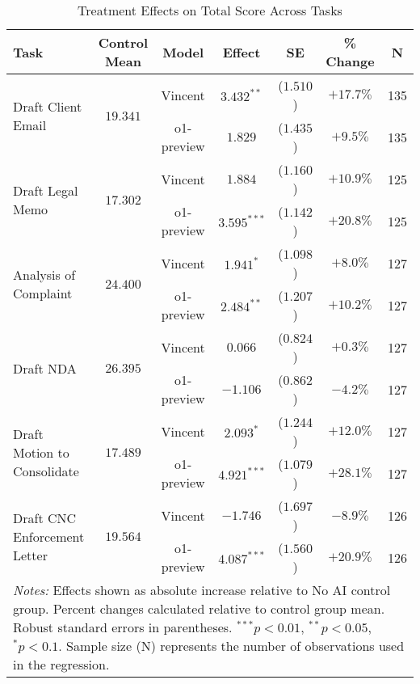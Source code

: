 \begin{table}[!htbp]
\centering
\caption{Treatment Effects on Total Score Across Tasks}
\label{tab:total_score_effects}
\begin{tabular}{lcccccc}
\hline\hline
Task & Control Mean & Model & Effect & SE & \% Change & N \\
\hline
\multirow{2}{*}{Draft Client Email} & \multirow{2}{*}{$19.341$} & Vincent & $3.432^{**}$ & ($1.510$) & $+17.7\%$ & 135 \\
& & o1-preview & $1.829$ & ($1.435$) & $+9.5\%$ & 135 \\
\hline
\multirow{2}{*}{Draft Legal Memo} & \multirow{2}{*}{$17.302$} & Vincent & $1.884$ & ($1.160$) & $+10.9\%$ & 125 \\
& & o1-preview & $3.595^{***}$ & ($1.142$) & $+20.8\%$ & 125 \\
\hline
\multirow{2}{*}{Analysis of Complaint} & \multirow{2}{*}{$24.400$} & Vincent & $1.941^{*}$ & ($1.098$) & $+8.0\%$ & 127 \\
& & o1-preview & $2.484^{**}$ & ($1.207$) & $+10.2\%$ & 127 \\
\hline
\multirow{2}{*}{Draft NDA} & \multirow{2}{*}{$26.395$} & Vincent & $0.066$ & ($0.824$) & $+0.3\%$ & 127 \\
& & o1-preview & $-1.106$ & ($0.862$) & $-4.2\%$ & 127 \\
\hline
\multirow{2}{*}{Draft Motion to Consolidate} & \multirow{2}{*}{$17.489$} & Vincent & $2.093^{*}$ & ($1.244$) & $+12.0\%$ & 127 \\
& & o1-preview & $4.921^{***}$ & ($1.079$) & $+28.1\%$ & 127 \\
\hline
\multirow{2}{*}{Draft CNC Enforcement Letter} & \multirow{2}{*}{$19.564$} & Vincent & $-1.746$ & ($1.697$) & $-8.9\%$ & 126 \\
& & o1-preview & $4.087^{***}$ & ($1.560$) & $+20.9\%$ & 126 \\
\hline
\multicolumn{7}{p{0.95\linewidth}}{\footnotesize \textit{Notes:} Effects shown as absolute increase relative to No AI control group. Percent changes calculated relative to control group mean. Robust standard errors in parentheses. $^{***}p<0.01$, $^{**}p<0.05$, $^{*}p<0.1$. Sample size (N) represents the number of observations used in the regression.}
\end{tabular}
\end{table}